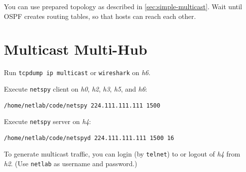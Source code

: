 \documentclass{../UTNetLab}
\begin{document}
You can use prepared topology as described in \autoref{sec:simple-multicast}.
Wait until OSPF creates routing tables, so that hosts can reach each other.



\section{Multicast Multi-Hub\label{sec:multi-hub}}

Run \lstinline{tcpdump ip multicast} or \lstinline{wireshark} on \textit{h6}.

Execute \lstinline{netspy} client on \textit{h0}, \textit{h2}, \textit{h3}, \textit{h5}, and \textit{h6}:

\begin{lstlisting}
/home/netlab/code/netspy 224.111.111.111 1500
    \end{lstlisting}

Execute \lstinline{netspy} server on \textit{h4}:

\begin{lstlisting}
/home/netlab/code/netspyd 224.111.111.111 1500 16
    \end{lstlisting}

To generate multicast traffic, you can login (by \lstinline{telnet}) to or logout of \textit{h4} from \textit{h2}. (Use \texttt{netlab} as username and password.)
\end{document}
